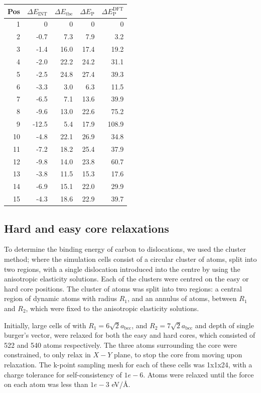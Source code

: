\documentclass[a4paper]{article}
\begin{document}
\begin{center}
\begin{tabular}{rrrrr}
Pos & \(\Delta E_{\text{INT}}\) & \(\Delta E_{\text{tbe}}\) & \(\Delta E_{\text{P}}\) & \(\Delta E_{\text{P}}^{\text{DFT}}\)\\
\hline
1 & 0 & 0 & 0 & 0\\
2 & -0.7 & 7.3 & 7.9 & 3.2\\
3 & -1.4 & 16.0 & 17.4 & 19.2\\
4 & -2.0 & 22.2 & 24.2 & 31.1\\
5 & -2.5 & 24.8 & 27.4 & 39.3\\
6 & -3.3 & 3.0 & 6.3 & 11.5\\
7 & -6.5 & 7.1 & 13.6 & 39.9\\
8 & -9.6 & 13.0 & 22.6 & 75.2\\
9 & -12.5 & 5.4 & 17.9 & 108.9\\
10 & -4.8 & 22.1 & 26.9 & 34.8\\
11 & -7.2 & 18.2 & 25.4 & 37.9\\
12 & -9.8 & 14.0 & 23.8 & 60.7\\
13 & -3.8 & 11.5 & 15.3 & 17.6\\
14 & -6.9 & 15.1 & 22.0 & 29.9\\
15 & -4.3 & 18.6 & 22.9 & 39.7\\
\end{tabular}
\end{center}

\subsection{Hard and easy core relaxations}
\label{sec:org9c9d46d}

To determine the binding energy of carbon to dislocations, we used the
cluster method; where the simulation cells consist of a circular cluster of
atoms, split into two regions, with a single dislocation introduced into the
centre by using the anisotropic elasticity solutions. Each of the clusters
were centred on the easy or hard core positions. The cluster of atoms was
split into two regions: a central region of dynamic atoms with radius \(R_1\),
and an annulus of atoms, between \(R_1\) and \(R_2\), which were fixed to the anisotropic
elasticity solutions. 

Initially, large cells of with \(R_1 = 6\sqrt{2}a_{\text{bcc}}\), and \(R_2 =
   7\sqrt{2}a_{\text{bcc}}\) and depth of single burger's vector, were relaxed
for both the easy and hard cores, which consisted of 522 and 540 atoms
respectively. The three atoms surrounding the core were constrained, to only
relax in \(X-Y\) plane, to stop the core from moving upon relaxation. The
k-point sampling mesh for each of these cells was 1x1x24, with a charge
tolerance for self-consistency of \(1e-6\). Atoms were relaxed until the force
on each atom was less than \(1e-3\) eV/\AA{}.  
\end{document}
